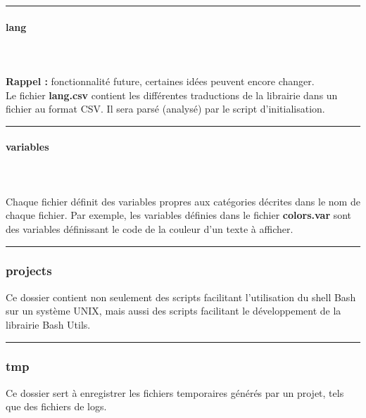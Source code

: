 \documentclass[a4paper,10pt]{article}
\begin{document}
\par\noindent\rule{\textwidth}{0.4pt}

\paragraph{lang}\mbox{}\\\mbox{}\\
\textbf{Rappel :} fonctionnalité future, certaines idées peuvent encore changer.\\[1\baselineskip]

Le fichier \textbf{\color{lime}lang.csv\color{white}} contient les différentes traductions de la librairie dans un fichier au format CSV. Il sera parsé (analysé) par le script d'initialisation.\\[1\baselineskip]

\par\noindent\rule{\textwidth}{0.4pt}

\paragraph{variables}\mbox{}\\\mbox{}\\
Chaque fichier définit des variables propres aux catégories décrites dans le nom de chaque fichier. Par exemple, les variables définies dans le fichier \textbf{\color{lime}colors.var\color{white}} sont des variables définissant le code de la couleur d'un texte à afficher.\\[1\baselineskip]



\color{blue}\par\noindent\rule{\textwidth}{0.4pt}\color{white}

\color{blue}
\subsubsection{projects}\color{white}
Ce dossier contient non seulement des scripts facilitant l'utilisation du shell Bash sur un système UNIX, mais aussi des scripts facilitant le développement de la librairie Bash Utils.\\[1\baselineskip]


\color{blue}\par\noindent\rule{\textwidth}{0.4pt}\color{white}

\color{blue}
\subsubsection{tmp}\color{white}
Ce dossier sert à enregistrer les fichiers temporaires générés par un projet, tels que des fichiers de logs.\\[1\baselineskip]
\end{document}
